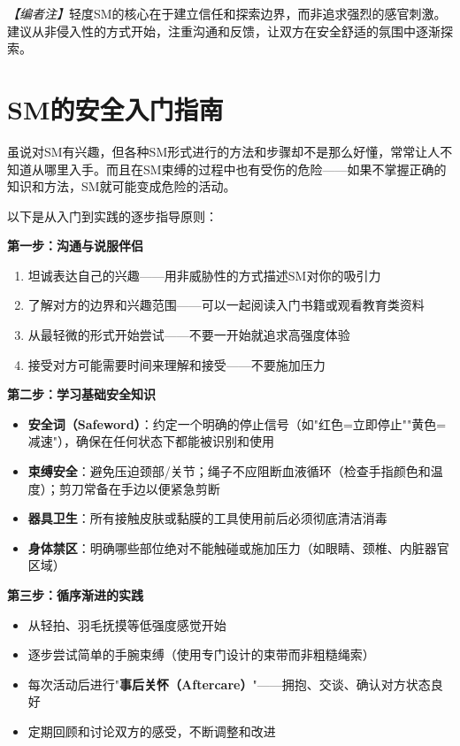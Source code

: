\documentclass[12pt,UTF8]{ctexbook}
\begin{document}
\textit{【编者注】}轻度SM的核心在于建立信任和探索边界，而非追求强烈的感官刺激。建议从非侵入性的方式开始，注重沟通和反馈，让双方在安全舒适的氛围中逐渐探索。

\section{SM的安全入门指南}

虽说对SM有兴趣，但各种SM形式进行的方法和步骤却不是那么好懂，常常让人不知道从哪里入手。而且在SM束缚的过程中也有受伤的危险——如果不掌握正确的知识和方法，SM就可能变成危险的活动。

以下是从入门到实践的逐步指导原则：

\noindent\textbf{第一步：沟通与说服伴侣}

\begin{enumerate}
	\item 坦诚表达自己的兴趣——用非威胁性的方式描述SM对你的吸引力
	\item 了解对方的边界和兴趣范围——可以一起阅读入门书籍或观看教育类资料
	\item 从最轻微的形式开始尝试——不要一开始就追求高强度体验
	\item 接受对方可能需要时间来理解和接受——不要施加压力
\end{enumerate}

\noindent\textbf{第二步：学习基础安全知识}

\begin{itemize}
	\item \textbf{安全词（Safeword）}：约定一个明确的停止信号（如"红色=立即停止""黄色=减速"），确保在任何状态下都能被识别和使用
	\item \textbf{束缚安全}：避免压迫颈部/关节；绳子不应阻断血液循环（检查手指颜色和温度）；剪刀常备在手边以便紧急剪断
	\item \textbf{器具卫生}：所有接触皮肤或黏膜的工具使用前后必须彻底清洁消毒
	\item \textbf{身体禁区}：明确哪些部位绝对不能触碰或施加压力（如眼睛、颈椎、内脏器官区域）
\end{itemize}

\noindent\textbf{第三步：循序渐进的实践}

\begin{itemize}
	\item 从轻拍、羽毛抚摸等低强度感觉开始
	\item 逐步尝试简单的手腕束缚（使用专门设计的束带而非粗糙绳索）
	\item 每次活动后进行"\textbf{事后关怀（Aftercare）}"——拥抱、交谈、确认对方状态良好
	\item 定期回顾和讨论双方的感受，不断调整和改进
\end{itemize}
\end{document}

